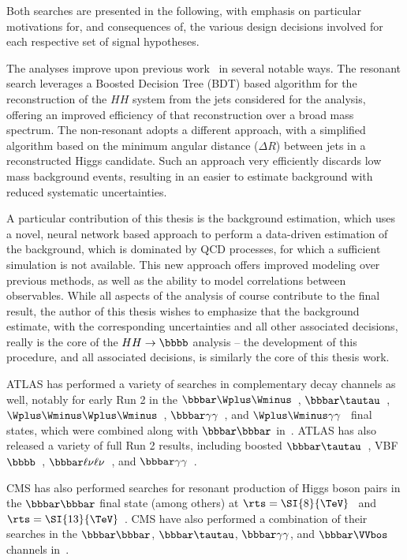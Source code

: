 Both searches are presented in the following, with emphasis on particular motivations for, and consequences
of, the various design decisions involved for each respective set of signal hypotheses. 

The analyses improve upon previous work~\cite{EXOT-2016-31} in several notable ways. The resonant search leverages 
a Boosted Decision Tree (BDT) based algorithm for the reconstruction of the $HH$ system from the jets considered for 
the analysis, offering an improved efficiency of that reconstruction over a broad mass spectrum. The non-resonant 
adopts a different approach, with 
a simplified algorithm based on the minimum angular distance ($\Delta R$) between jets in a reconstructed 
Higgs candidate. Such an approach very efficiently discards low mass background events, resulting in an 
easier to estimate background with reduced systematic uncertainties.

A particular contribution of this thesis is the background estimation, which uses a novel, neural network
based approach to perform a data-driven estimation of the background, which is dominated by QCD processes, for which 
a sufficient simulation is not available. This new approach offers improved modeling over previous methods, as 
well as the ability to model correlations between observables. While all aspects of the analysis of course contribute 
to the final result, the author of this 
thesis wishes to emphasize that the background estimate, with the corresponding uncertainties and all 
other associated decisions, really is the core of the $HH\rightarrow \bbbb$ analysis -- the development
of this procedure, and all associated decisions, is similarly the core of this thesis work.

ATLAS has performed a variety of searches in complementary decay channels as well,
notably for early Run 2 in the $\bbbar\Wplus\Wminus$~\cite{HIGG-2016-27},
$\bbbar\tautau$~\cite{HIGG-2016-16},
$\Wplus\Wminus\Wplus\Wminus$~\cite{HIGG-2016-24},
$\bbbar\gamma\gamma$~\cite{HIGG-2016-15}, and
$\Wplus\Wminus\gamma\gamma$~\cite{HIGG-2016-20} final states, which were combined
along with $\bbbar\bbbar$ in~\cite{HDBS-2018-58}. ATLAS has also released 
a variety of full Run 2 results, including boosted $\bbbar\tautau$~\cite{HDBS-2019-22}, 
VBF $\bbbb$~\cite{HDBS-2018-18}, $\bbbar\ell\nu\ell\nu$~\cite{HDBS-2018-33}, and 
$\bbbar\gamma\gamma$~\cite{ATLAS-CONF-2021-016}.

CMS has also performed searches for resonant production of Higgs boson pairs in
the $\bbbar\bbbar$ final state (among others) at
$\rts = \SI{8}{\TeV}$~\cite{CMS-EXO-12-053} and
$\rts = \SI{13}{\TeV}$~\cite{CMS-B2G-17-019}. CMS have also performed a
combination of their searches in the $\bbbar\bbbar$, $\bbbar\tautau$,
$\bbbar\gamma\gamma$, and $\bbbar\VVbos$ channels in~\cite{CMS-HIG-17-030}.

